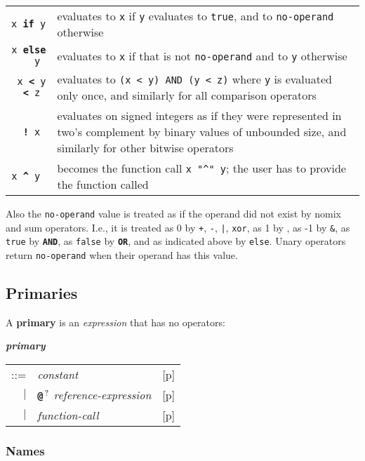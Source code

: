 \documentclass[12pt]{article}
\newcommand{\TT}[1]{{\tt \bfseries #1}}
\newcommand{\QMARK}{{$^{\,\mbox{\footnotesize ?}}$}}
\newcommand{\key}[1]{{\rm \bfseries #1}}
\newcommand{\emkey}[1]{{\em \bfseries #1}}
\newcommand{\pagref}[1]{p\pageref{#1}}
\newenvironment{indpar}[1][0.3in]%
	{\begin{list}{}%
		     {\setlength{\itemsep}{0in}%
		      \setlength{\topsep}{0in}%
		      \setlength{\parsep}{1ex}%
		      \setlength{\labelwidth}{#1}%
		      \setlength{\leftmargin}{#1}%
		      \addtolength{\leftmargin}{\labelsep}}%
	 \item}%
	{\end{list}}
\begin{document}
\begin{indpar}
\begin{tabular}{rp{5.0in}}
\tt x \TT{if} y & evaluates to {\tt x} if {\tt y} evaluates to {\tt true},
                  and to {\tt no-operand} otherwise
\\[0.5ex]
\tt x \TT{else} y & evaluates to {\tt x} if that is not {\tt no-operand}
                  and to {\tt y} otherwise
\\[0.5ex]
\tt x \TT{<} y \TT{<} z & evaluates to {\tt (x < y) AND (y < z)} where
                  {\tt y} is evaluated only once, and similarly for
		  all comparison operators
\\[0.5ex]
\tt \TT{!} x & evaluates on signed integers as if they were represented
               in two's complement by binary values of unbounded size,
	       and similarly for other bitwise operators
\\[0.5ex]
\tt x \TT{\textasciicircum} y
	& becomes the function call {\tt x~"\textasciicircum"~y}; the
	  user has to provide the function called
\end{tabular}
\end{indpar}

Also the {\tt no-operand} value is treated as if the operand did not exist
by nomix and sum operators.  I.e., it is treated as
0 by {\tt +}, {\tt -}, {\tt |}, {\tt xor},
as 1 by {\tt *},
as -1 by {\tt \&},
as {\tt true} by \TT{AND},
as {\tt false} by \TT{OR},
and as indicated above by {\tt else}.
Unary operators return {\tt no-operand} when their operand
has this value.

\subsection{Primaries}

A \key{primary} is an {\em expression} that has no operators:
\begin{indpar}
\emkey{primary}
    \begin{tabular}[t]{@{}rll}
    ::= & {\em constant}		& [\pagref{CONSTANTS}] \\
    $|$ & \TT{@}\QMARK{} {\em reference-expression}
                                        & [\pagref{REFERENCE-EXPRESSIONS}] \\
    $|$ & {\em function-call}		& [\pagref{FUNCTION-CALLS}] \\
    \end{tabular}
\end{indpar}

\subsubsection{Names}
\label{NAMES}
\end{document}
